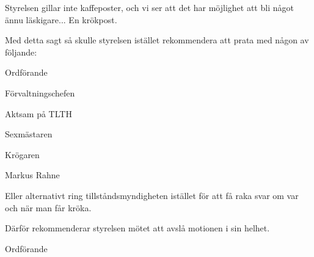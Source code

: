 \documentclass[../_main/handlingar.tex]{subfiles}
\begin{document}
\motionssvar

Styrelsen gillar inte kaffeposter, och vi ser att det har möjlighet att bli något ännu läskigare... En krökpost.

Med detta sagt så skulle styrelsen istället rekommendera att prata med någon av följande:
\begin{dashlist}
    \item Ordförande
    \item Förvaltningschefen
    \item Aktsam på TLTH
    \item Sexmästaren
    \item Krögaren
    \item Markus Rahne
\end{dashlist}

Eller alternativt ring tillståndsmyndigheten istället för att få raka svar om var och när man får kröka.


Därför rekommenderar styrelsen mötet att avslå motionen i sin helhet.

\begin{signatures}{1}
    \ist
    \signature{\ordf}{Ordförande}
\end{signatures}
\end{document}
